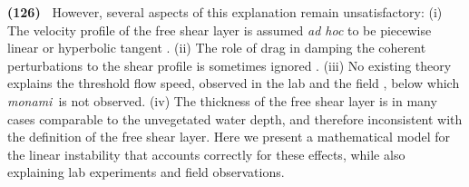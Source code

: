 \documentclass[aps,prl,reprint,twocolumn,superscriptaddress,sort&compress,10pt]{revtex4-1}  %
\newcommand{\monami}{\textit{monami}}
\newcommand{\words}[1]{\textbf{(#1)~}}
\begin{document}
\words{126} However, several aspects of this explanation remain unsatisfactory: 
(i)   The velocity profile of the free shear layer is assumed \textit{ad hoc} to be piecewise linear \cite{Delangre06} or hyperbolic tangent \cite{Ghisal02,Raupach96}. 
(ii)  The role of drag in damping the coherent perturbations to the shear profile is sometimes ignored \cite{Raupach96}. 
(iii) No existing theory explains the threshold flow speed, observed in the lab \cite{Ghisal02} and the field \cite{Grizzle96}, below which \monami ~is not observed.
(iv)  The thickness of the free shear layer is in many cases comparable to the unvegetated water depth, and therefore inconsistent with the definition of the free shear layer.
Here we present a mathematical model for the linear instability that accounts correctly for these effects, while also explaining lab experiments and field observations.
\end{document}
